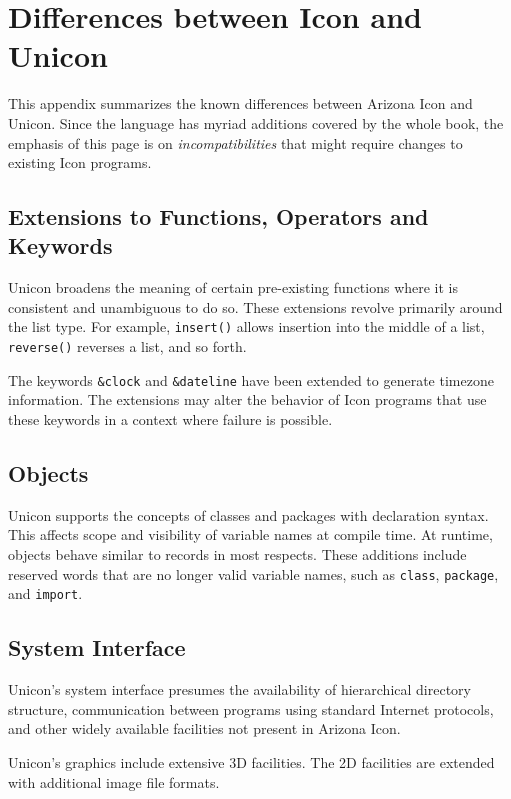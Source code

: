 \chapter{Differences between Icon and Unicon}

\label{Unicon-Icon}
This appendix summarizes the known differences between Arizona Icon and
Unicon. Since the language has myriad additions covered by the whole book,
the emphasis of this page is on {\em incompatibilities\/} that might
require changes to existing Icon programs.

\section{Extensions to Functions, Operators and Keywords}

Unicon broadens the meaning of certain pre-existing functions where it
is consistent and unambiguous to do so. These extensions revolve
primarily around the list type. For example,
\texttt{insert()} allows insertion into the middle of a
list, \texttt{reverse()} reverses a list, and so forth.

The keywords \texttt{\&clock} and
\texttt{\&dateline}
have been extended to generate timezone information. The extensions
may alter the behavior of Icon programs that use these keywords in a
context where failure is possible.

\section{Objects}

Unicon supports the concepts of classes and packages with declaration
syntax. This affects scope and visibility of variable names at compile
time. At runtime, objects behave similar to records in most respects.
These additions include reserved words that are no longer valid variable
names, such as \texttt{class}, \texttt{package}, and \texttt{import}.

\section{System Interface}

Unicon's system interface presumes the availability of
hierarchical directory structure, communication between programs using
standard Internet protocols, and other widely available facilities not
present in Arizona Icon.

Unicon's graphics include extensive 3D facilities.  The 2D facilities
are extended with additional image file formats.

